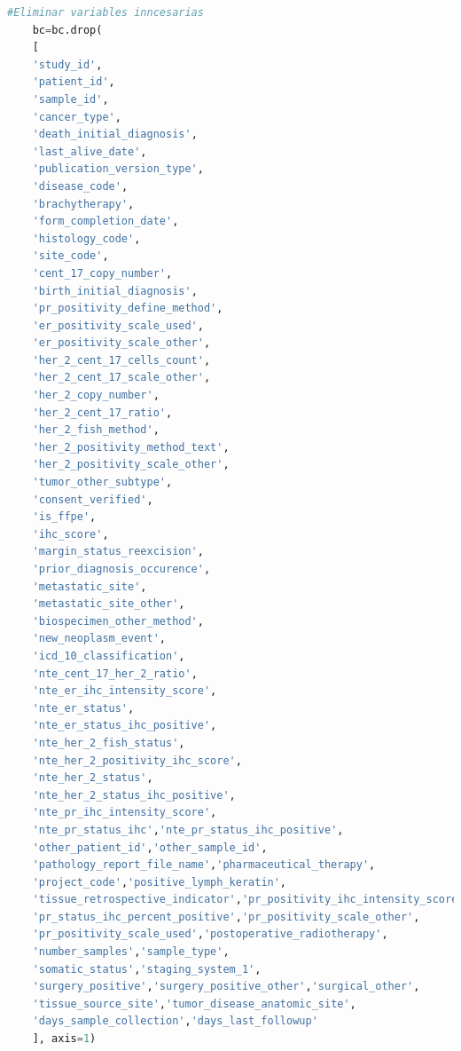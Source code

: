   \begin{lstlisting}[basicstyle=\tiny,language=Python, label=eliminacion, caption=Eliminar datos poco relvantes en Python.]
	#Eliminar variables inncesarias
	bc=bc.drop(
	[
	'study_id',
	'patient_id',
	'sample_id',
	'cancer_type',
	'death_initial_diagnosis',
	'last_alive_date',
	'publication_version_type',
	'disease_code',
	'brachytherapy',
	'form_completion_date',
	'histology_code',
	'site_code',
	'cent_17_copy_number',
	'birth_initial_diagnosis',
	'pr_positivity_define_method',
	'er_positivity_scale_used',
	'er_positivity_scale_other',
	'her_2_cent_17_cells_count',
	'her_2_cent_17_scale_other',
	'her_2_copy_number',
	'her_2_cent_17_ratio',
	'her_2_fish_method',
	'her_2_positivity_method_text',
	'her_2_positivity_scale_other',
	'tumor_other_subtype',
	'consent_verified',
	'is_ffpe',
	'ihc_score',
	'margin_status_reexcision',
	'prior_diagnosis_occurence',
	'metastatic_site',
	'metastatic_site_other',
	'biospecimen_other_method',
	'new_neoplasm_event',
	'icd_10_classification',
	'nte_cent_17_her_2_ratio',
	'nte_er_ihc_intensity_score',
	'nte_er_status',
	'nte_er_status_ihc_positive',
	'nte_her_2_fish_status',
	'nte_her_2_positivity_ihc_score',
	'nte_her_2_status',
	'nte_her_2_status_ihc_positive',
	'nte_pr_ihc_intensity_score',
	'nte_pr_status_ihc','nte_pr_status_ihc_positive',
	'other_patient_id','other_sample_id',
	'pathology_report_file_name','pharmaceutical_therapy',
	'project_code','positive_lymph_keratin',
	'tissue_retrospective_indicator','pr_positivity_ihc_intensity_score',
	'pr_status_ihc_percent_positive','pr_positivity_scale_other',
	'pr_positivity_scale_used','postoperative_radiotherapy',
	'number_samples','sample_type',
	'somatic_status','staging_system_1',
	'surgery_positive','surgery_positive_other','surgical_other',
	'tissue_source_site','tumor_disease_anatomic_site',
	'days_sample_collection','days_last_followup'
	], axis=1)
 \end{lstlisting}

